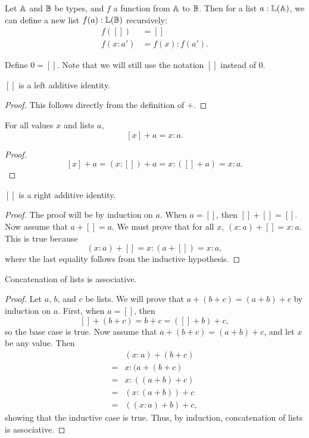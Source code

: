 \documentclass[../../math.tex]{subfiles}
\begin{document}
\begin{definition}
    Let $\mathbb{A}$ and $\mathbb{B}$ be types, and $f$ a function from $\mathbb{A}$ to $\mathbb{B}$.  Then for
    a list $a : \mathbb{L}(\mathbb{A})$, we can define a new list $f(a) : \mathbb{L}(\mathbb{B})$ recursively:
    \begin{align*}
            f([]) &= [] \\
        f(x : a') &= f(x) : f(a').
    \end{align*}
\end{definition}

\begin{instance}
    Define $0 = []$.  Note that we will still use the notation $[]$ instead of
    $0$.
\end{instance}

\begin{instance}
    $[]$ is a left additive identity.
\end{instance}
\begin{proof}
    This follows directly from the definition of $+$.
\end{proof}

\begin{theorem}
    For all values $x$ and lists $a$,
    \[
        [x] + a = x : a.
    \]
\end{theorem}
\begin{proof}
    \[
        [x] + a = (x : []) + a = x : ([] + a) = x : a.
    \]
\end{proof}

\begin{instance}
    $[]$ is a right additive identity.
\end{instance}
\begin{proof}
    The proof will be by induction on $a$.  When $a = []$, then $[] + [] = []$.
    Now assume that $a + [] = a$.  We must prove that for all $x$, $(x : a) + []
    = x : a$.  This is true because
    \[
        (x : a) + [] = x : (a + []) = x : a,
    \]
    where the last equality follows from the inductive hypothesis.
\end{proof}

\begin{instance}
    Concatenation of lists is associative.
\end{instance}
\begin{proof}
    Let $a$, $b$, and $c$ be lists.  We will prove that $a + (b + c) =
    (a + b) + c$ by induction on $a$.  First, when $a = []$, then
    \[
        [] + (b + c) = b + c = ([] + b) + c,
    \]
    so the base case is true.  Now assume that $a + (b + c) = (a +
    b) + c$, and let $x$ be any value.  Then
    \begin{align*}
        &(x : a) + (b + c) \\
        ={}& x : (a + (b + c) \\
        ={}& x : ((a + b) + c) \\
        ={}& (x : (a + b)) + c \\
        ={}& ((x : a) + b) + c,
    \end{align*}
    showing that the inductive case is true.  Thus, by induction, concatenation
    of lists is associative.
\end{proof}
\end{document}
